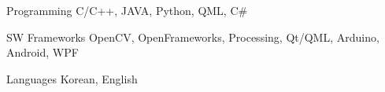 


\begin{cvskills}

  \cvskill
    {Programming} %
    {C/C++, JAVA, Python, QML, C\#} %

  \cvskill
    {SW Frameworks} %
    {OpenCV, OpenFrameworks, Processing, Qt/QML, Arduino, Android, WPF} %

  \cvskill
    {Languages} %
    {Korean, English} %

\end{cvskills}
